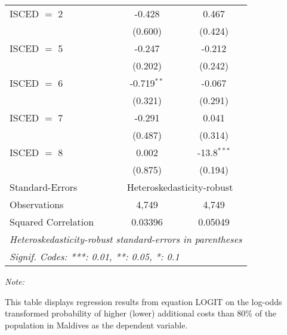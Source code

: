 \begin{table}[htbp!]
\begin{adjustbox}{width = 1\textwidth, max height = 0.95\textheight, center}
\begin{threeparttable}[b]
\begin{tabular}{lcc}
            ISCED $=$ 2          & -0.428        & 0.467\\   
                                 & (0.600)       & (0.424)\\   
            ISCED $=$ 5          & -0.247        & -0.212\\   
                                 & (0.202)       & (0.242)\\   
            ISCED $=$ 6          & -0.719$^{**}$ & -0.067\\   
                                 & (0.321)       & (0.291)\\   
            ISCED $=$ 7          & -0.291        & 0.041\\   
                                 & (0.487)       & (0.314)\\   
            ISCED $=$ 8          & 0.002         & -13.8$^{***}$\\   
                                 & (0.875)       & (0.194)\\   
            \midrule 
            Standard-Errors & \multicolumn{2}{c}{Heteroskedasticity-robust} \\ 
            Observations         & 4,749         & 4,749\\  
            Squared Correlation  & 0.03396       & 0.05049\\  
            \midrule \midrule
            \multicolumn{3}{l}{\emph{Heteroskedasticity-robust standard-errors in parentheses}}\\
            \multicolumn{3}{l}{\emph{Signif. Codes: ***: 0.01, **: 0.05, *: 0.1}}\\
         \end{tabular}
         
         \begin{tablenotes}\item \medskip \textit{Note:}
            \item This table displays regression results from equation LOGIT on the log-odds transformed probability of higher (lower) additional costs than 80\% of the population in Maldives as the dependent variable. 
         \end{tablenotes}
      \end{threeparttable}
   \end{adjustbox}
\end{table}


